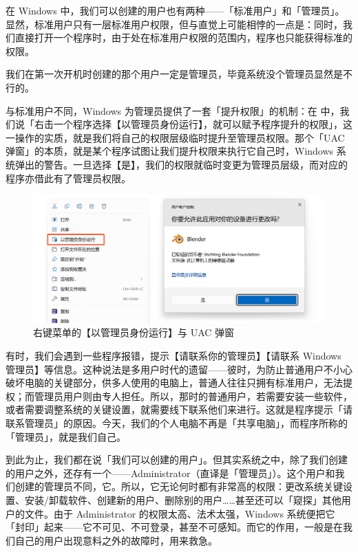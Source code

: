 {{{在 Windows 中，我们可以创建的用户也有两种——「标准用户」和「管理员」。显然，标准用户只有一层标准用户权限，但与直觉上可能相悖的一点是：同时，我们直接打开一个程序时，由于处在标准用户权限的范围内，程序也只能获得标准的权限。

\begin{note}
  我们在第一次开机时创建的那个用户一定是管理员，毕竟系统没个管理员显然是不行的。
\end{note}

与标准用户不同，Windows 为管理员提供了一套「提升权限」的机制：在 中，我们说「右击一个程序选择【以管理员身份运行】，就可以赋予程序提升的权限」，这一操作的实质，就是我们将自己的权限层级临时提升至管理员权限。那个「UAC 弹窗」的本质，就是某个程序试图让我们提升权限来执行它自己时，Windows 系统弹出的警告。一旦选择【是】，我们的权限就临时变更为管理员层级，而对应的程序亦借此有了管理员权限。

\begin{figure}[htb!]
  \centering
  \includegraphics[width=.75\textwidth]{assets/advanced/Menu_and_UAC.png}
  \caption{右键菜单的【以管理员身份运行】与 UAC 弹窗}
  \label{fig:Menu_and_UAC}
\end{figure}

有时，我们会遇到一些程序报错，提示【请联系你的管理员】【请联系 Windows 管理员】等信息。这种说法是多用户时代的遗留——彼时，为防止普通用户不小心破坏电脑的关键部分，供多人使用的电脑上，普通人往往只拥有标准用户，无法提权；而管理员用户则由专人担任。所以，那时的普通用户，若需要安装一些软件，或者需要调整系统的关键设置，就需要线下联系他们来进行。这就是程序提示「请联系管理员」的原因。今天，我们的个人电脑不再是「共享电脑」，而程序所称的「管理员」，就是我们自己。

到此为止，我们都在说「我们可以创建的用户」。但其实系统之中，除了我们创建的用户之外，还存有一个——Administrator（直译是「管理员」）。这个用户和我们创建的管理员不同，它。所以，它无论何时都有非常高的权限：更改系统关键设置、安装/卸载软件、创建新的用户、删除别的用户……甚至还可以「窥探」其他用户的文件。由于 Administrator 的权限太高、法术太强，Windows 系统便把它「封印」起来——它不可见、不可登录，甚至不可感知。而它的作用，一般是在我们自己的用户出现意料之外的故障时，用来救急。

}}}
